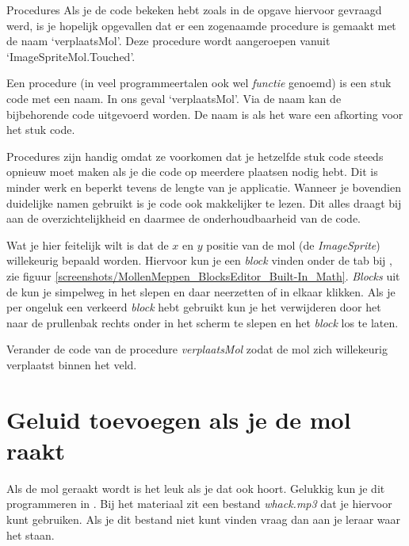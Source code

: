 \begin{derivation}{Procedures}
Als je de code bekeken hebt zoals in de opgave hiervoor gevraagd werd, is je hopelijk opgevallen dat er een zogenaamde procedure is gemaakt met de naam `verplaatsMol'. Deze procedure wordt aangeroepen vanuit `ImageSpriteMol.Touched'.

Een procedure (in veel programmeertalen ook wel \emph{functie} genoemd) is een stuk code met een naam. In ons geval `verplaatsMol'. Via de naam kan de bijbehorende code uitgevoerd worden. De naam is als het ware een afkorting voor het stuk code.

Procedures zijn handig omdat ze voorkomen dat je hetzelfde stuk code steeds opnieuw moet maken als je die code op meerdere plaatsen nodig hebt. Dit is minder werk en beperkt tevens de lengte van je applicatie. Wanneer je bovendien duidelijke namen gebruikt is je code ook makkelijker te lezen. Dit alles draagt bij aan de overzichtelijkheid en daarmee de onderhoudbaarheid van de code.
\end{derivation}

Wat je hier feitelijk wilt is dat de $x$ en $y$ positie van de mol (de \emph{ImageSprite}) willekeurig bepaald worden. Hiervoor kun je een \emph{block} vinden onder de  tab bij , zie figuur \ref{screenshots/MollenMeppen_BlocksEditor_Built-In_Math}. \emph{Blocks} uit de  kun je simpelweg in het  slepen en daar neerzetten of in elkaar klikken. Als je per ongeluk een verkeerd \emph{block} hebt gebruikt kun je het verwijderen door het naar de prullenbak rechts onder in het scherm te slepen en het \emph{block} los te laten.


\begin{opgave}
    \opgVraag
	Verander de code van de procedure \emph{verplaatsMol} zodat de mol zich willekeurig verplaatst binnen het veld.
\end{opgave}


\section{Geluid toevoegen als je de mol raakt}
Als de mol geraakt wordt is het leuk als je dat ook hoort. Gelukkig kun je dit programmeren in \ai. Bij het materiaal zit een bestand \emph{whack.mp3} dat je hiervoor kunt gebruiken. Als je dit bestand niet kunt vinden vraag dan aan je leraar waar het staan.


